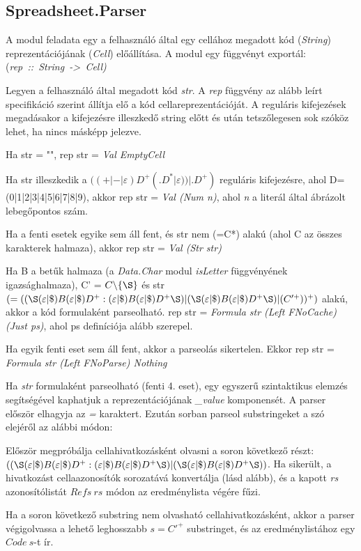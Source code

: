 \subsection{Spreadsheet.Parser}

A modul feladata egy a felhasználó által egy cellához megadott kód (\textit{String}) reprezentációjának (\textit{Cell}) előállítása. A modul egy függvényt exportál: \mbox{(\textit{rep :: String -> Cell)}}

Legyen a felhasználó által megadott kód \textit{str}. A \textit{rep} függvény az alább leírt specifikáció szerint állítja elő a kód cellareprezentációját. A reguláris kifejezések megadásakor a kifejezésre illeszkedő string előtt és után tetszőlegesen sok szóköz lehet, ha nincs másképp jelezve.

\begin{compactenum}
	\item Ha str = "", rep str = \textit{Val EmptyCell}
	\item Ha str illeszkedik a $((+|-|\varepsilon)D^+(.D^*|\varepsilon))|.D^+)$ reguláris kifejezésre, ahol D=(0|1|2|3|4|5|6|7|8|9), akkor rep str = \textit{Val (Num n)}, ahol \textit{n} a literál által ábrázolt lebegőpontos szám. 
	\item Ha a fenti esetek egyike sem áll fent, és str nem (=C*) alakú (ahol C az összes karakterek halmaza), akkor rep str = \textit{Val (Str str)}
	\item Ha B a betűk halmaza (a \textit{Data.Char} modul \textit{isLetter} függvényének igazsághalmaza), C' = $C \backslash \{\S\}$ és str \mbox{$(=((\S  (\varepsilon|\$)B(\varepsilon|\$)D^+:(\varepsilon|\$)B(\varepsilon|\$)D^+\S )|(\S (\varepsilon|\$)B(\varepsilon|\$)D^+\S )|(C'^+))^+)$} alakú, akkor a kód formulaként parseolható. rep str = \textit{Formula str (Left FNoCache) (Just ps)}, ahol ps definíciója alább szerepel.
	\item Ha egyik fenti eset sem áll fent, akkor a parseolás sikertelen. Ekkor rep str = \textit{Formula str (Left FNoParse) Nothing}
\end{compactenum}

Ha \textit{str} formulaként parseolható (fenti 4. eset), egy egyszerű szintaktikus elemzés segítségével kaphatjuk a reprezentációjának \textit{\_value} komponensét. A parser először elhagyja az \textit{=} karaktert. Ezután sorban parseol substringeket a szó elejéről az alábbi módon:
\begin{compactenum}
	\item Először megpróbálja cellahivatkozásként olvasni a soron következő részt: $((\S  (\varepsilon|\$)B(\varepsilon|\$)D^+:(\varepsilon|\$)B(\varepsilon|\$)D^+\S )|(\S (\varepsilon|\$)B(\varepsilon|\$)D^+\S ))$. Ha sikerült, a hivatkozást cellaazonosítók sorozatává konvertálja (lásd alább), és a kapott \textit{rs} azonosítólistát $Refs\ rs$ módon az eredménylista végére fűzi.
	\item Ha a soron következő substring nem olvasható cellahivatkozásként, akkor a parser végigolvassa a lehető leghosszabb $s = C'^+$ substringet, és az eredménylistához egy $Code\ s$-t ír.
\end{compactenum}

